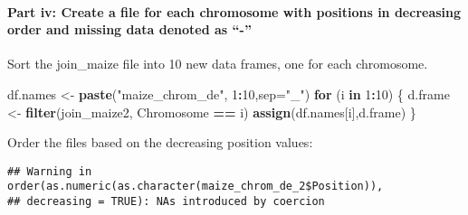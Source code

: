 \documentclass[]{article}
\newenvironment{Shaded}{\begin{snugshade}}{\end{snugshade}}
\newcommand{\ControlFlowTok}[1]{\textcolor[rgb]{0.13,0.29,0.53}{\textbf{#1}}}
\newcommand{\DataTypeTok}[1]{\textcolor[rgb]{0.13,0.29,0.53}{#1}}
\newcommand{\DecValTok}[1]{\textcolor[rgb]{0.00,0.00,0.81}{#1}}
\newcommand{\KeywordTok}[1]{\textcolor[rgb]{0.13,0.29,0.53}{\textbf{#1}}}
\newcommand{\NormalTok}[1]{#1}
\newcommand{\OperatorTok}[1]{\textcolor[rgb]{0.81,0.36,0.00}{\textbf{#1}}}
\newcommand{\OtherTok}[1]{\textcolor[rgb]{0.56,0.35,0.01}{#1}}
\newcommand{\StringTok}[1]{\textcolor[rgb]{0.31,0.60,0.02}{#1}}
\let\oldparagraph\paragraph
\renewcommand{\paragraph}[1]{\oldparagraph{#1}\mbox{}}
\begin{document}
\hypertarget{part-iv-create-a-file-for-each-chromosome-with-positions-in-decreasing-order-and-missing-data-denoted-as--}{%
\paragraph{Part iv: Create a file for each chromosome with positions in
decreasing order and missing data denoted as
``-''}\label{part-iv-create-a-file-for-each-chromosome-with-positions-in-decreasing-order-and-missing-data-denoted-as--}}

Sort the join\_maize file into 10 new data frames, one for each
chromosome.

\begin{Shaded}
\begin{Highlighting}[]
\NormalTok{df.names <-}\StringTok{ }\KeywordTok{paste}\NormalTok{(}\StringTok{"maize_chrom_de"}\NormalTok{, }\DecValTok{1}\OperatorTok{:}\DecValTok{10}\NormalTok{,}\DataTypeTok{sep=}\StringTok{"_"}\NormalTok{)}
\ControlFlowTok{for}\NormalTok{ (i }\ControlFlowTok{in} \DecValTok{1}\OperatorTok{:}\DecValTok{10}\NormalTok{) \{}
\NormalTok{  d.frame <-}\StringTok{ }\KeywordTok{filter}\NormalTok{(join_maize2, Chromosome }\OperatorTok{==}\StringTok{ }\NormalTok{i)}
  \KeywordTok{assign}\NormalTok{(df.names[i],d.frame)}
\NormalTok{\}}
\end{Highlighting}
\end{Shaded}

Order the files based on the decreasing position values:

\begin{Shaded}
\end{Shaded}

\begin{verbatim}
## Warning in order(as.numeric(as.character(maize_chrom_de_2$Position)),
## decreasing = TRUE): NAs introduced by coercion
\end{verbatim}
\end{document}
